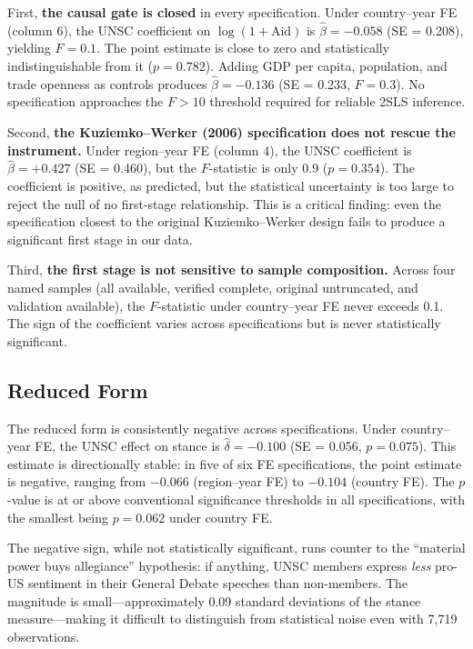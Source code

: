 First, \textbf{the causal gate is closed} in every specification. Under country--year FE (column 6), the UNSC coefficient on $\log(1+\text{Aid})$ is $\hat{\beta} = -0.058$ (SE = 0.208), yielding $F = 0.1$. The point estimate is close to zero and statistically indistinguishable from it ($p = 0.782$). Adding GDP per capita, population, and trade openness as controls produces $\hat{\beta} = -0.136$ (SE = 0.233, $F = 0.3$). No specification approaches the $F>10$ threshold required for reliable 2SLS inference.

Second, \textbf{the Kuziemko--Werker (2006) specification does not rescue the instrument.} Under region--year FE (column 4), the UNSC coefficient is $\hat{\beta} = +0.427$ (SE = 0.460), but the $F$-statistic is only 0.9 ($p = 0.354$). The coefficient is positive, as predicted, but the statistical uncertainty is too large to reject the null of no first-stage relationship. This is a critical finding: even the specification closest to the original Kuziemko--Werker design fails to produce a significant first stage in our data.

Third, \textbf{the first stage is not sensitive to sample composition.} Across four named samples (all available, verified complete, original untruncated, and validation available), the $F$-statistic under country--year FE never exceeds 0.1. The sign of the coefficient varies across specifications but is never statistically significant.

\subsection{Reduced Form}

The reduced form is consistently negative across specifications. Under country--year FE, the UNSC effect on stance is $\hat{\delta} = -0.100$ (SE = 0.056, $p = 0.075$). This estimate is directionally stable: in five of six FE specifications, the point estimate is negative, ranging from $-0.066$ (region--year FE) to $-0.104$ (country FE). The $p$-value is at or above conventional significance thresholds in all specifications, with the smallest being $p = 0.062$ under country FE.

The negative sign, while not statistically significant, runs counter to the ``material power buys allegiance'' hypothesis: if anything, UNSC members express \emph{less} pro-US sentiment in their General Debate speeches than non-members. The magnitude is small---approximately 0.09 standard deviations of the stance measure---making it difficult to distinguish from statistical noise even with 7,719 observations.

